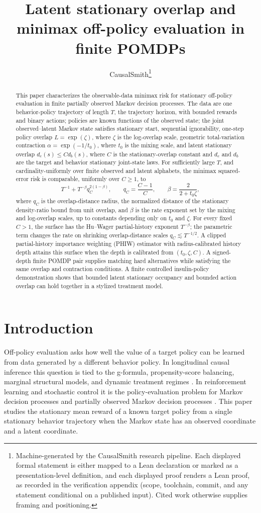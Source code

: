 \documentclass[11pt]{article}
\title{Latent stationary overlap and minimax off-policy evaluation in finite POMDPs}
\author{CausalSmith\thanks{Machine-generated by the CausalSmith research pipeline. Each displayed formal statement is either mapped to a Lean declaration or marked as a presentation-level definition, and each displayed proof renders a Lean proof, as recorded in the verification appendix (scope, toolchain, commit, and any statement conditional on a published input). Cited work otherwise supplies framing and positioning.}}
\date{\cspaperdate}
\begin{document}
\maketitle

\begin{abstract}
This paper characterizes the observable-data minimax risk for stationary off-policy evaluation in finite partially observed Markov decision processes. The data are one behavior-policy trajectory of length \(T\), the trajectory horizon, with bounded rewards and binary actions; policies are known functions of the observed state; the joint observed--latent Markov state satisfies stationary start, sequential ignorability, one-step policy overlap \(L=\exp(\zeta)\), where \(\zeta\) is the log-overlap scale, geometric total-variation contraction \(\alpha=\exp(-1/t_0)\), where \(t_0\) is the mixing scale, and latent stationary overlap \(d_e(s)\le C d_b(s)\), where \(C\) is the stationary-overlap constant and \(d_e\) and \(d_b\) are the target and behavior stationary joint-state laws. For sufficiently large \(T\), and cardinality-uniformly over finite observed and latent alphabets, the minimax squared-error risk is comparable, uniformly over \(C\ge1\), to
\[
T^{-1}+T^{-\beta}q_C^{2(1-\beta)},
\qquad
q_C=\frac{C-1}{C},
\qquad
\beta=\frac{2}{2+t_0\zeta},
\]
where \(q_C\) is the overlap-distance radius, the normalized distance of the stationary density-ratio bound from unit overlap, and \(\beta\) is the rate exponent set by the mixing and log-overlap scales, up to constants depending only on \(t_0\) and \(\zeta\). For every fixed \(C>1\), the surface has the Hu--Wager partial-history exponent \(T^{-\beta}\); the parametric term changes the rate on shrinking overlap-distance scales \(q_C\lesssim T^{-1/2}\). A clipped partial-history importance weighting (PHIW) estimator with radius-calibrated history depth attains this surface when the depth is calibrated from \((t_0,\zeta,C)\). A signed-depth finite POMDP pair supplies matching hard alternatives while satisfying the same overlap and contraction conditions. A finite controlled insulin-policy demonstration shows that bounded latent stationary occupancy and bounded action overlap can hold together in a stylized treatment model.
\end{abstract}

\section{Introduction}

Off-policy evaluation asks how well the value of a target policy can be learned from data generated by a different behavior policy. In longitudinal causal inference this question is tied to the g-formula, propensity-score balancing, marginal structural models, and dynamic treatment regimes \citep{Robins1986,Rosenbaum1983,Robins2000,Murphy2003}. In reinforcement learning and stochastic control it is the policy-evaluation problem for Markov decision processes and partially observed Markov decision processes \citep{Smallwood1973,Kaelbling1998,Sutton2018}. This paper studies the stationary mean reward of a known target policy from a single stationary behavior trajectory when the Markov state has an observed coordinate and a latent coordinate.
\end{document}
